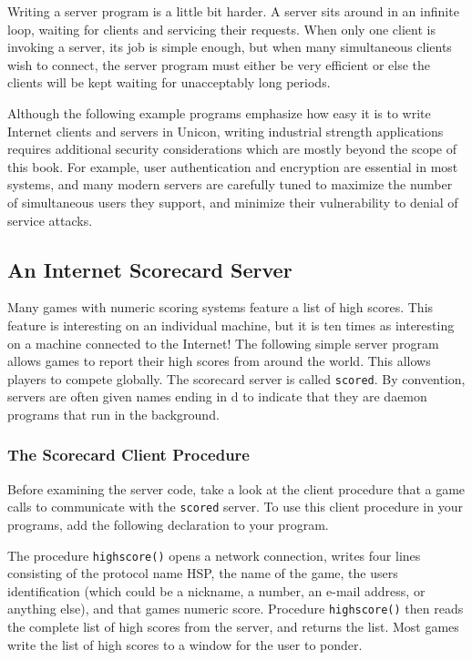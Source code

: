 Writing a server program is a little bit harder. A server sits around in
an infinite loop, waiting for clients and servicing their requests.
When only one client is invoking a server, its job is simple enough,
but when many simultaneous clients wish to connect, the server program
must either be very efficient or else the clients will be kept waiting
for unacceptably long periods.

Although the following example programs emphasize how easy it is to
write Internet clients and servers in Unicon, writing
{\textquotedbl}industrial strength{\textquotedbl} applications requires
additional security considerations which are mostly beyond the scope of
this book. For example, user authentication and encryption are
essential in most systems, and many modern servers are carefully tuned
to maximize the number of simultaneous users they support, and minimize
their vulnerability to denial of service attacks.

\subsection{An Internet Scorecard Server}

Many games with numeric scoring systems feature a list of high scores.
This feature is interesting on an individual machine, but it is ten
times as interesting on a machine connected to the Internet! The
following simple server program allows games to report
their high scores from around the world. This allows players to compete
globally. The scorecard server is called \texttt{scored}. By
convention, servers are often given names ending in
{\textquotedbl}d{\textquotedbl} to indicate that they are daemon
programs that run in the background.

\subsubsection{The Scorecard Client Procedure}

Before examining the server code, take a look at the client procedure
that a game calls to communicate with the \texttt{scored} server. To
use this client procedure in your programs, add the following
declaration to your program.


The procedure \texttt{highscore()} opens a network connection, writes
four lines consisting of the protocol name
{\textquotedbl}HSP{\textquotedbl}, the name of the game, the
user{\textquotesingle}s identification (which could be a nickname, a
number, an e-mail address, or anything else), and that
game{\textquotesingle}s numeric score. Procedure \texttt{highscore()}
then reads the complete list of high scores from the server, and
returns the list. Most games write the list of high scores to a window
for the user to ponder.

